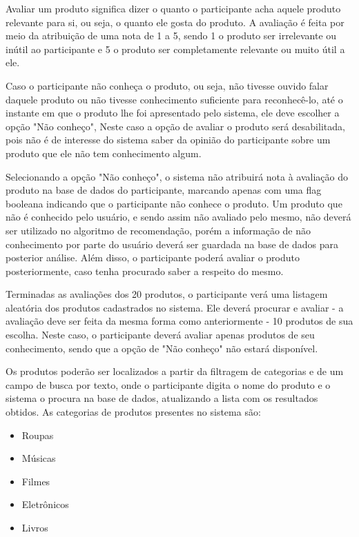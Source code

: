  Avaliar um produto significa dizer o quanto o participante acha aquele produto relevante para si, ou seja, o quanto ele gosta do produto. A avaliação é feita por meio da atribuição de uma nota de 1 a 5, sendo 1 o produto ser irrelevante ou inútil ao participante e 5 o produto ser completamente relevante ou muito útil a ele. 

 Caso o participante não conheça o produto, ou seja, não tivesse ouvido falar daquele produto ou não tivesse conhecimento suficiente para reconhecê-lo, até o instante em que o produto lhe foi apresentado pelo sistema, ele deve escolher a opção "Não conheço", Neste caso a opção de avaliar o produto será desabilitada, pois não é de interesse do sistema saber da opinião do participante sobre um produto que ele não tem conhecimento algum.

 Selecionando a opção "Não conheço", o sistema não atribuirá nota à avaliação do produto na base de dados do participante, marcando apenas com uma flag booleana indicando que o participante não conhece o produto. Um produto que não é conhecido pelo usuário, e sendo assim não avaliado pelo mesmo, não deverá ser utilizado no algoritmo de recomendação, porém a informação de não conhecimento por parte do usuário deverá ser guardada na base de dados para posterior análise. Além disso, o participante poderá avaliar o produto posteriormente, caso tenha procurado saber a respeito do mesmo.

 Terminadas as avaliações dos 20 produtos, o participante verá uma listagem aleatória dos produtos cadastrados no sistema. Ele deverá procurar e avaliar - a avaliação deve ser feita da mesma forma como anteriormente - 10 produtos de sua escolha. Neste caso, o participante deverá avaliar apenas produtos de seu conhecimento, sendo que a opção de "Não conheço" não estará disponível.

 Os produtos poderão ser localizados a partir da filtragem de categorias e de um campo de busca por texto, onde o participante digita o nome do produto e o sistema o procura na base de dados, atualizando a lista com os resultados obtidos. As categorias de produtos presentes no sistema são:

\begin{itemize}
	\item Roupas
	\item Músicas
	\item Filmes
	\item Eletrônicos
	\item Livros
\end{itemize}

